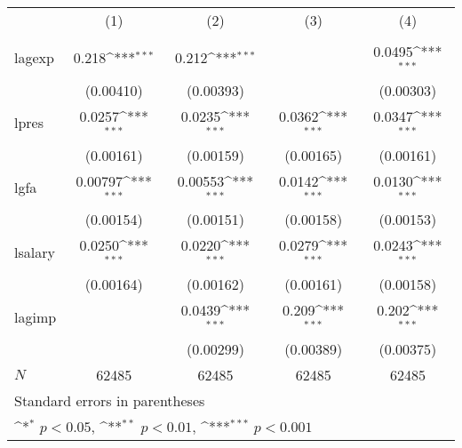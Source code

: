 {
\def\sym#1{\ifmmode^{#1}\else\(^{#1}\)\fi}
\begin{tabular}{l*{4}{c}}
\hline\hline
            &\multicolumn{1}{c}{(1)}&\multicolumn{1}{c}{(2)}&\multicolumn{1}{c}{(3)}&\multicolumn{1}{c}{(4)}\\
            &\multicolumn{1}{c}{} &\multicolumn{1}{c}{} &\multicolumn{1}{c}{} &\multicolumn{1}{c}{} \\
\hline
lagexp      &       0.218\sym{***}&       0.212\sym{***}&                     &      0.0495\sym{***}\\
            &   (0.00410)         &   (0.00393)         &                     &   (0.00303)         \\
[1em]
lpres       &      0.0257\sym{***}&      0.0235\sym{***}&      0.0362\sym{***}&      0.0347\sym{***}\\
            &   (0.00161)         &   (0.00159)         &   (0.00165)         &   (0.00161)         \\
[1em]
lgfa        &     0.00797\sym{***}&     0.00553\sym{***}&      0.0142\sym{***}&      0.0130\sym{***}\\
            &   (0.00154)         &   (0.00151)         &   (0.00158)         &   (0.00153)         \\
[1em]
lsalary     &      0.0250\sym{***}&      0.0220\sym{***}&      0.0279\sym{***}&      0.0243\sym{***}\\
            &   (0.00164)         &   (0.00162)         &   (0.00161)         &   (0.00158)         \\
[1em]
lagimp      &                     &      0.0439\sym{***}&       0.209\sym{***}&       0.202\sym{***}\\
            &                     &   (0.00299)         &   (0.00389)         &   (0.00375)         \\
\hline
\(N\)       &       62485         &       62485         &       62485         &       62485         \\
\hline\hline
\multicolumn{5}{l}{\footnotesize Standard errors in parentheses}\\
\multicolumn{5}{l}{\footnotesize \sym{*} \(p<0.05\), \sym{**} \(p<0.01\), \sym{***} \(p<0.001\)}\\
\end{tabular}
}
